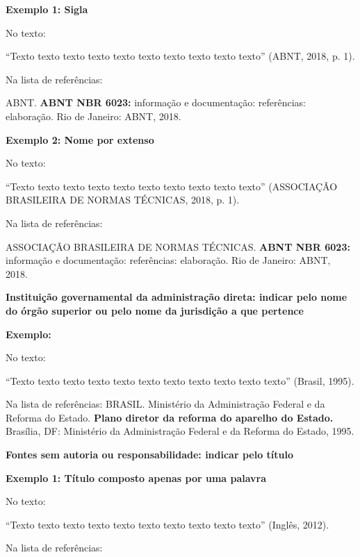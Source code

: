 \vspace{0.5cm}\noindent\textbf{Exemplo 1: Sigla}

\noindent No texto:

“Texto texto texto texto texto texto texto texto texto texto” (ABNT, 2018, p. 1). 

\noindent Na lista de referências:

\noindent ABNT. \textbf{ABNT NBR 6023:} informação e documentação: referências: elaboração. Rio de Janeiro: ABNT, 2018.

\vspace{0.5cm}\noindent\textbf{Exemplo 2: Nome por extenso}

\noindent No texto:

“Texto texto texto texto texto texto texto texto texto texto” (ASSOCIAÇÃO BRASILEIRA DE NORMAS TÉCNICAS, 2018, p. 1).

\noindent Na lista de referências:

\noindent ASSOCIAÇÃO BRASILEIRA DE NORMAS TÉCNICAS. \textbf{ABNT NBR 6023:} informação e documentação: referências: elaboração. Rio de Janeiro: ABNT, 2018.

\vspace{0.5cm}\noindent\textbf{Instituição governamental da administração direta: indicar pelo nome do órgão superior ou pelo nome da jurisdição a que pertence}

\vspace{0.5cm}\noindent\textbf{Exemplo:}

\noindent No texto:

“Texto texto texto texto texto texto texto texto texto texto texto” (Brasil, 1995).

\noindent Na lista de referências:
\noindent BRASIL. Ministério da Administração Federal e da Reforma do Estado. \textbf{Plano diretor da reforma do aparelho do Estado.} Brasília, DF: Ministério da Administração Federal e da Reforma do Estado, 1995.

\vspace{0.5cm}\noindent\textbf{Fontes sem autoria ou responsabilidade: indicar pelo título}

\vspace{0.5cm}\noindent\textbf{Exemplo 1: Título composto apenas por uma palavra}

\noindent No texto:

“Texto texto texto texto texto texto texto texto texto texto” (Inglês, 2012).

\noindent Na lista de referências:

